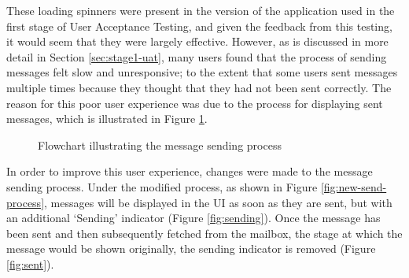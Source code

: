 These loading spinners were present in the version of the application used in the first stage of User Acceptance Testing, and given the feedback from this testing, it would seem that they were largely effective. However, as is discussed in more detail in Section \ref{sec:stage1-uat}, many users found that the process of sending messages felt slow and unresponsive; to the extent that some users sent messages multiple times because they thought that they had not been sent correctly. The reason for this poor user experience was due to the process for displaying sent messages, which is illustrated in Figure \ref{fig:send-process}.

\begin{figure}[h!]
  \begin{center}
    \caption{Flowchart illustrating the message sending process}
    \label{fig:send-process}
  \end{center}
\end{figure}

In order to improve this user experience, changes were made to the message sending process. Under the modified process, as shown in Figure \ref{fig:new-send-process}, messages will be displayed in the UI as soon as they are sent, but with an additional `Sending' indicator (Figure \ref{fig:sending}). Once the message has been sent and then subsequently fetched from the mailbox, the stage at which the message would be shown originally, the sending indicator is removed (Figure \ref{fig:sent}).

